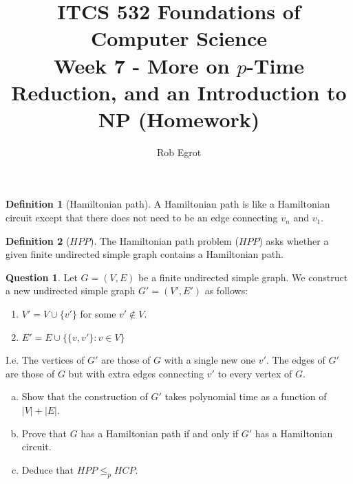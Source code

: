 \documentclass{article}
\title{ITCS 532 Foundations of Computer Science\\
Week 7 - More on $p$-Time Reduction, and an Introduction to $\mathbf{NP}$ (Homework)}
\author{Rob Egrot}
\date{}
\theoremstyle{definition}
\newtheorem{Q}{Question}
\newtheorem{definition}{Definition}
\begin{document}
\maketitle
\begin{definition}[Hamiltonian path]
A Hamiltonian path is like a Hamiltonian circuit except that there does not need to be an edge connecting $v_n$ and $v_1$.
\end{definition}

\begin{definition}[$HPP$]
The Hamiltonian path problem ($HPP$) asks whether a given finite undirected simple graph contains a Hamiltonian path.
\end{definition}

\begin{Q}
Let $G=(V,E)$ be a finite undirected simple graph. We construct a new undirected simple graph $G'=(V',E')$ as follows:
\begin{enumerate}
\item $V'=V\cup\{v'\}$ for some $v'\notin V$.
\item $E'= E\cup \{\{v,v'\}:v\in V\}$
\end{enumerate}
I.e. The vertices of $G'$ are those of $G$ with a single new one $v'$. The edges of $G'$ are those of $G$ but with extra edges connecting $v'$ to every vertex of $G$.
\begin{enumerate}[a)]
\item Show that the construction of $G'$ takes polynomial time as a function of $|V|+|E|$.
\item Prove that $G$ has a Hamiltonian path if and only if $G'$ has a Hamiltonian circuit.
\item Deduce that $HPP\leq_p HCP$.
\end{enumerate}
\end{Q}

\end{document}

